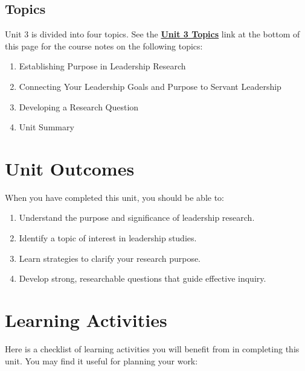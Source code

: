 \documentclass[
  letterpaper,
  DIV=11,
  numbers=noendperiod]{scrreprt}
\providecommand{\tightlist}{%
  \setlength{\itemsep}{0pt}\setlength{\parskip}{0pt}}\usepackage{longtable,booktabs,array}
\begin{document}
\subsection*{Topics}\label{topics-2}

Unit 3 is divided into four topics. See the
\href{https://learn.twu.ca/mod/book/view.php?id=1174788}{\textbf{Unit 3
Topics}} link at the bottom of this page for the course notes on the
following topics:

\begin{enumerate}
\def\labelenumi{\arabic{enumi}.}
\tightlist
\item
  Establishing Purpose in Leadership Research
\item
  Connecting Your Leadership Goals and Purpose to Servant Leadership
\item
  Developing a Research Question
\item
  Unit Summary
\end{enumerate}

\section*{Unit Outcomes}\label{unit-outcomes-2}


When you have completed this unit, you should be able to:

\begin{enumerate}
\def\labelenumi{\arabic{enumi}.}
\tightlist
\item
  Understand the purpose and significance of leadership research.
\item
  Identify a topic of interest in leadership studies.
\item
  Learn strategies to clarify your research purpose.
\item
  Develop strong, researchable questions that guide effective inquiry.
\end{enumerate}

\section*{Learning Activities}\label{learning-activities-2}


Here is a checklist of learning activities you will benefit from in
completing this unit. You may find it useful for planning your work:
\end{document}
